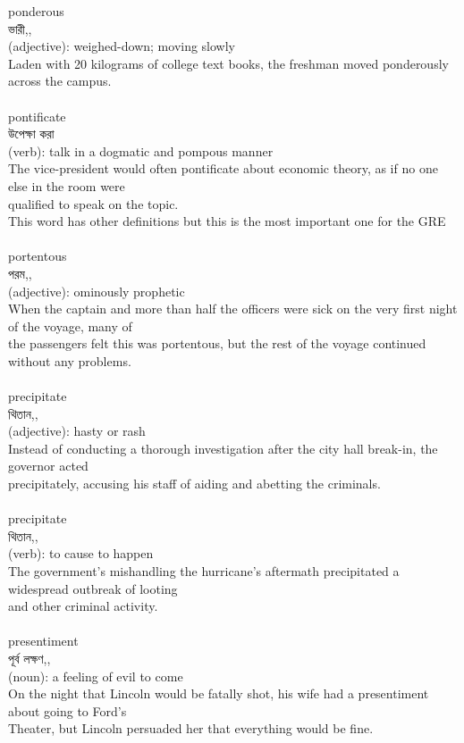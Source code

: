 \documentclass{article}
\begin{document}
{{ponderous}\\
{ভারী,,}\\
{(adjective): weighed-down; moving slowly\\Laden with 20 kilograms of college text books, the freshman moved ponderously across the campus.\\}\\
{pontificate}\\
{উপেক্ষা করা}\\
{(verb): talk in a dogmatic and pompous manner\\The vice-president would often pontificate about economic theory, as if no one else in the room were\\qualified to speak on the topic.\\This word has other definitions but this is the most important one for the GRE\\}\\
{portentous}\\
{পরম,,}\\
{(adjective): ominously prophetic\\When the captain and more than half the officers were sick on the very first night of the voyage, many of\\the passengers felt this was portentous, but the rest of the voyage continued without any problems.\\}\\
{precipitate}\\
{থিতান,,}\\
{(adjective): hasty or rash\\Instead of conducting a thorough investigation after the city hall break-in, the governor acted\\precipitately, accusing his staff of aiding and abetting the criminals.\\}\\
{precipitate}\\
{থিতান,,}\\
{(verb): to cause to happen\\The government's mishandling the hurricane's aftermath precipitated a widespread outbreak of looting\\and other criminal activity.\\}\\
{presentiment}\\
{পূর্ব লক্ষণ,,}\\
{(noun): a feeling of evil to come\\On the night that Lincoln would be fatally shot, his wife had a presentiment about going to Ford's\\Theater, but Lincoln persuaded her that everything would be fine.\\}\\
}
\end{document}
